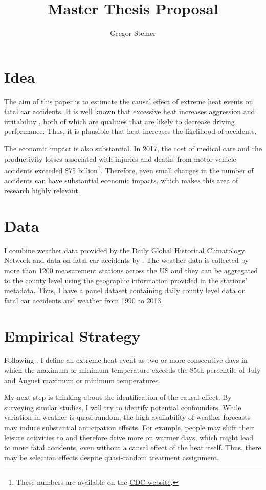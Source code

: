\documentclass[11pt]{article}
\author{Gregor Steiner}
\title{Master Thesis Proposal}
\begin{document}
\maketitle

\section*{Idea}

The aim of this paper is to estimate the causal effect of extreme heat events on fatal car accidents. It is well known that excessive heat increases aggression and irritability \citep{anderson2011implications}, both of which are qualities that are likely to decrease driving performance. Thus, it is plausible that heat increases the likelihood of accidents.

The economic impact is also substantial. In 2017, the cost of medical care and the productivity losses associated with injuries and deaths from motor vehicle accidents exceeded \$75 billion\footnote{These numbers are available on the \href{https://www.cdc.gov/transportationsafety/costs/index.html}{CDC website}.}. Therefore, even small changes in the number of accidents can have substantial economic impacts, which makes this area of research highly relevant.

\section*{Data}

I combine weather data provided by the Daily Global Historical Climatology Network \citep{Menne_2012} and data on fatal car accidents by \citet{Smith_2016}. The weather data is collected by more than 1200 measurement stations across the US and they can be aggregated to the county level using the geographic information provided in the stations' metadata. Thus, I have a panel dataset containing daily county level data on fatal car accidents and weather from 1990 to 2013.

\section*{Empirical Strategy}

Following \citet{Habeeb_2015}, I define an extreme heat event as two or more
consecutive days in which the maximum or minimum temperature exceeds the 85th percentile of July and August maximum or minimum temperatures. 

My next step is thinking about the identification of the causal effect. By surveying similar studies, I will try to identify potential confounders. While variation in weather is quasi-random, the high availability of weather forecasts may induce substantial anticipation effects. For example, people may shift their leisure activities to and therefore drive more on warmer days, which might lead to more fatal accidents, even without a causal effect of the heat itself. Thus, there may be selection effects despite quasi-random treatment assignment.
\end{document}
